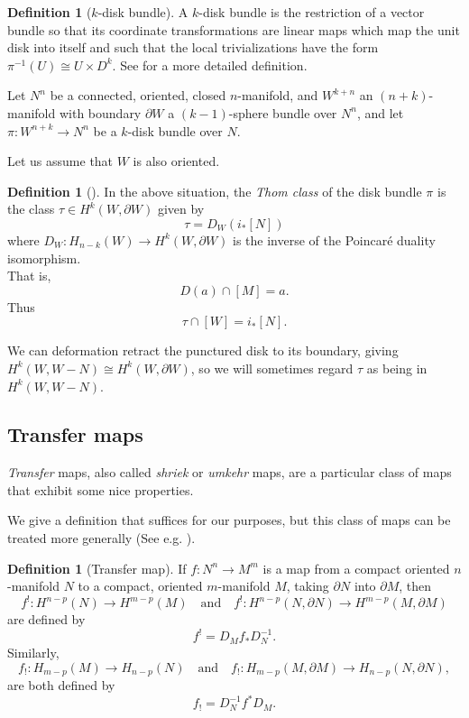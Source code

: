 \documentclass[reqno]{amsart}
\theoremstyle{definition}
\newtheorem{definition}[theorem]{Definition}
\theoremstyle{remark}
\begin{document}
\begin{definition}[$k$-disk bundle]
    A $k$-disk bundle is the restriction of a vector bundle so that its
    coordinate transformations are linear maps which map
    the unit disk into itself and such that
    the local trivializations have the form
    $\pi^{-1}(U) \cong U \times D^{k}$.
    See \cite{Bredon} for a more detailed definition.
\end{definition}

Let $N^{n}$ be a connected, oriented, closed $n$-manifold, and
$W^{k+n}$ an $(n+k)$-manifold with boundary
$\partial W$ a $(k-1)$-sphere bundle over $N^{n}$, and let
$\pi \colon W^{n+k} \to N^{n}$ be a $k$-disk bundle over $N$.

Let us assume that $W$ is also oriented.

\begin{definition}[]
    In the above situation, the \textit{Thom class} of the
    disk bundle $\pi$ is the class $\tau \in 
    H^{k}\left( W, \partial W \right) $ given by
    \[
    \tau = D_W \left( i_* \left[ N \right]  \right) 
    \] 
    where $D_W \colon H_{n-k} (W) \to H^{k}(W, \partial W)$ is
    the inverse of the Poincaré duality isomorphism.\\
    That is,
    \[
    D(a) \cap \left[ M \right]  = a.
    \] 
    Thus
    \[
    \tau \cap \left[ W \right] =
    i_* \left[ N \right] .
    \] 
\end{definition}

We can deformation retract the punctured disk to its boundary, giving
$H^{k}(W, W-N) \cong H^{k}(W, \partial W)$, so we will
sometimes regard
$\tau$ as being in $H^{k}(W, W-N)$.


\subsection{Transfer maps}

\textit{Transfer} maps, also called \textit{shriek} or
\textit{umkehr} maps, are a particular class of maps that exhibit 
some nice properties. 

We give a definition that suffices for our purposes, but
this class of maps can be treated more generally (See e.g. \cite{Dold}).

\begin{definition}[Transfer map]
    If $f \colon N^{n} \to M^{m}$ is a map from a 
    compact oriented $n$-manifold $N$ to a compact, oriented
    $m$-manifold $M$, taking 
    $\partial N$ into $\partial M$, then
    \[
    f^{!} \colon H^{n-p} (N) \to H^{m-p}(M) \quad
    \text{and} \quad 
    f^{!} \colon H^{n-p}(N, \partial N) \to H^{m-p}(M, \partial M)
    \] 
    are defined by
    \[
    f^{!} = D_M f_* D_N^{-1}.
    \] 
    Similarly,
    \[
    f_! \colon H_{m-p}(M) \to H_{n-p}(N) \quad
    \text{and} \quad
    f_{!} \colon H_{m-p}(M, \partial M) \to 
    H_{n-p}(N, \partial N),
    \] 
    are both defined by
    \[
    f_! = D_N^{-1} f^{*} D_M.
    \] 
\end{definition}
\end{document}
